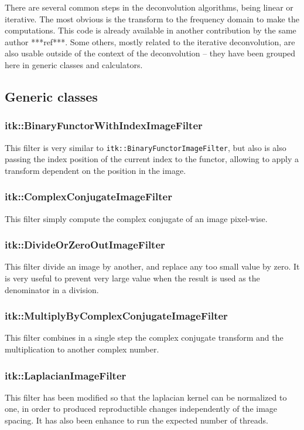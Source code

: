 \documentclass{InsightArticle}
\begin{document}
There are several common steps in the deconvolution algorithms, being linear or iterative. The most obvious is the transform
to the frequency domain to make the computations. This code is already available in another contribution by the same author ***ref***.
Some others, mostly related to the iterative deconvolution, are also usable outside of the context of the deconvolution -- they
have been grouped here in generic classes and calculators.

\subsection{Generic classes}

\subsubsection{itk::BinaryFunctorWithIndexImageFilter}
This filter is very similar to \verb$itk::BinaryFunctorImageFilter$, but also is also passing the index position of the
current index to the functor, allowing to apply a transform dependent on the position in the image.

\subsubsection{itk::ComplexConjugateImageFilter}
This filter simply compute the complex conjugate of an image pixel-wise.

\subsubsection{itk::DivideOrZeroOutImageFilter}
This filter divide an image by another, and replace any too small value by zero. It is very useful to prevent very large value
when the result is used as the denominator in a division.

\subsubsection{itk::MultiplyByComplexConjugateImageFilter}
This filter combines in a single step the complex conjugate transform and the multiplication to another complex number.

\subsubsection{itk::LaplacianImageFilter}
This filter has been modified so that the laplacian kernel can be normalized to one, in order to produced reproductible changes
independently of the image spacing. It has also been enhance to run the expected number of threads.
\end{document}
